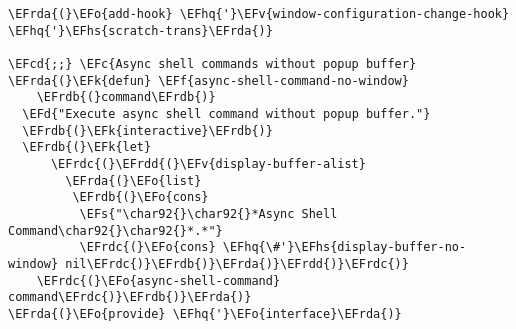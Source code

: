\documentclass[a4wide,10pt]{article}
\newcommand{\EFc}[1]{\textcolor{EFc}{#1}} %
\newcommand{\EFcd}[1]{\textcolor{EFcd}{#1}} %
\newcommand{\EFs}[1]{\textcolor{EFs}{#1}} %
\newcommand{\EFd}[1]{\textcolor{EFd}{#1}} %
\newcommand{\EFk}[1]{\textcolor{EFk}{#1}} %
\newcommand{\EFf}[1]{\textcolor{EFf}{#1}} %
\newcommand{\EFv}[1]{\textcolor{EFv}{#1}} %
\newcommand{\EFo}[1]{\textcolor{EFo}{#1}} %
\newcommand{\EFhq}[1]{\textcolor{EFhq}{#1}} %
\newcommand{\EFhs}[1]{\textcolor{EFhs}{#1}} %
\newcommand{\EFrda}[1]{\textcolor{EFrda}{#1}} %
\newcommand{\EFrdb}[1]{\textcolor{EFrdb}{#1}} %
\newcommand{\EFrdc}[1]{\textcolor{EFrdc}{#1}} %
\newcommand{\EFrdd}[1]{\textcolor{EFrdd}{#1}} %
\begin{document}
\begin{Code}
\begin{Verbatim}
\EFrda{(}\EFo{add-hook} \EFhq{'}\EFv{window-configuration-change-hook} \EFhq{'}\EFhs{scratch-trans}\EFrda{)}

\EFcd{;;} \EFc{Async shell commands without popup buffer}
\EFrda{(}\EFk{defun} \EFf{async-shell-command-no-window}
    \EFrdb{(}command\EFrdb{)}
  \EFd{"Execute async shell command without popup buffer."}
  \EFrdb{(}\EFk{interactive}\EFrdb{)}
  \EFrdb{(}\EFk{let}
      \EFrdc{(}\EFrdd{(}\EFv{display-buffer-alist}
        \EFrda{(}\EFo{list}
         \EFrdb{(}\EFo{cons}
          \EFs{"\char92{}\char92{}*Async Shell Command\char92{}\char92{}*.*"}
          \EFrdc{(}\EFo{cons} \EFhq{\#'}\EFhs{display-buffer-no-window} nil\EFrdc{)}\EFrdb{)}\EFrda{)}\EFrdd{)}\EFrdc{)}
    \EFrdc{(}\EFo{async-shell-command} command\EFrdc{)}\EFrdb{)}\EFrda{)}
\EFrda{(}\EFo{provide} \EFhq{'}\EFo{interface}\EFrda{)}
\end{Verbatim}
\end{Code}
\end{document}
